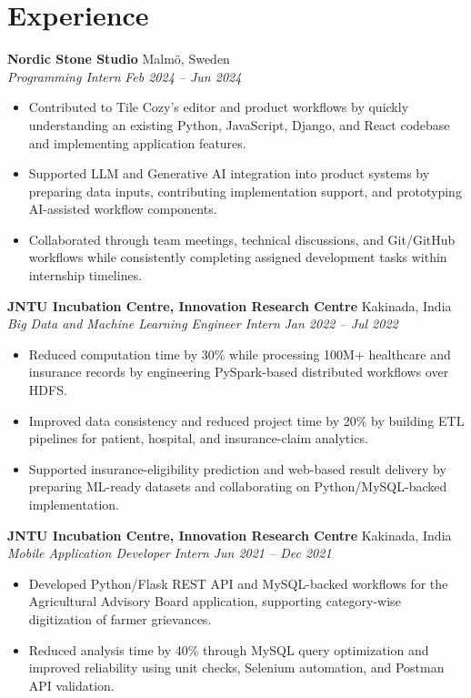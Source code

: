 \documentclass[10pt,a4paper]{article}
\newcommand{\resumeSubheading}[4]{
    \vspace{3pt}
    \textbf{#1} \hfill #2\\
    \textit{#3} \hfill \textit{#4}
    \vspace{2pt}
}
\begin{document}
\section{Experience}

\resumeSubheading
{Nordic Stone Studio}
{Malm{\"o}, Sweden}
{Programming Intern}
{Feb 2024 -- Jun 2024}
\begin{itemize}
    \item Contributed to Tile Cozy's editor and product workflows by quickly understanding an existing Python, JavaScript, Django, and React codebase and implementing application features.
    \item Supported LLM and Generative AI integration into product systems by preparing data inputs, contributing implementation support, and prototyping AI-assisted workflow components.
    \item Collaborated through team meetings, technical discussions, and Git/GitHub workflows while consistently completing assigned development tasks within internship timelines.
\end{itemize}

\resumeSubheading
{JNTU Incubation Centre, Innovation Research Centre}
{Kakinada, India}
{Big Data and Machine Learning Engineer Intern}
{Jan 2022 -- Jul 2022}
\begin{itemize}
    \item Reduced computation time by 30\% while processing 100M+ healthcare and insurance records by engineering PySpark-based distributed workflows over HDFS.
    \item Improved data consistency and reduced project time by 20\% by building ETL pipelines for patient, hospital, and insurance-claim analytics.
    \item Supported insurance-eligibility prediction and web-based result delivery by preparing ML-ready datasets and collaborating on Python/MySQL-backed implementation.
\end{itemize}

\resumeSubheading
{JNTU Incubation Centre, Innovation Research Centre}
{Kakinada, India}
{Mobile Application Developer Intern}
{Jun 2021 -- Dec 2021}
\begin{itemize}
    \item Developed Python/Flask REST API and MySQL-backed workflows for the Agricultural Advisory Board application, supporting category-wise digitization of farmer grievances.
    \item Reduced analysis time by 40\% through MySQL query optimization and improved reliability using unit checks, Selenium automation, and Postman API validation.
\end{itemize}
\end{document}
